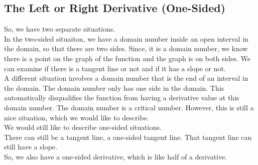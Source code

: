 \documentclass{ximera}
\begin{document}
\subsection*{The Left or Right Derivative (One-Sided)}


So, we have two separate situations. \\


In the two-sided situaiton, we have a domain number inside an open interval in the domain, so that there are two sides. Since, it is a domain number, we know there is a point on the graph of the function and the graph is on both sides.  We can examine if there is a tangent line or not and if it has a slope or not. \\

A different situation involves a domain number that is the end of an interval in the domain.  The domain number only has one side in the domain.  This automatically disqualifies the function from having a derivative value at this domain number.  The domain number is a critical number.  However, this is still a nice situation, which we would like to describe. \\

We would still like to describe one-sided situations. \\

There can still be a tangent line, a one-sided tangent line. That tangent line can still have a slope. \\

So, we also have a one-sided derivative, which is like half of a derivative. \\
\end{document}
